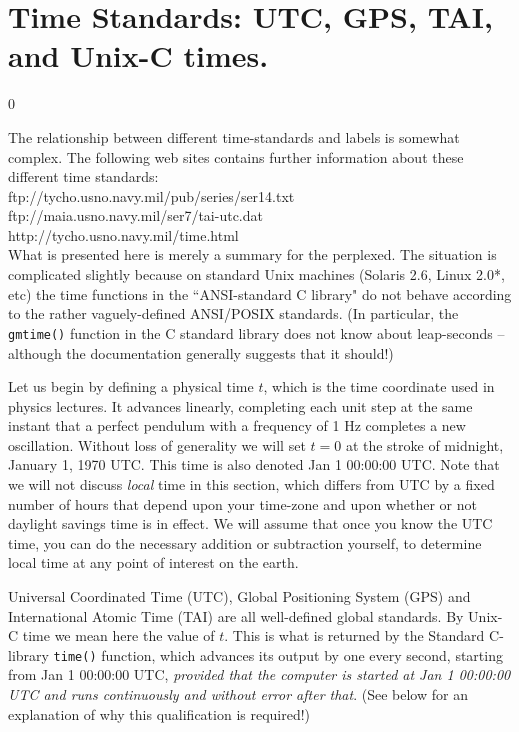 \clearpage
\section{Time Standards: UTC, GPS, TAI, and Unix-C times.}
\label{s:timestandards}
\setcounter{equation}0

The relationship between different time-standards and labels is somewhat
complex.  The following web sites contains further information about
these different time standards:\\
{ftp://tycho.usno.navy.mil/pub/series/ser14.txt}\\
{ftp://maia.usno.navy.mil/ser7/tai-utc.dat}\\
{http://tycho.usno.navy.mil/time.html}\\
What is presented here is merely a summary for the perplexed.
The situation is complicated slightly because on standard Unix machines
(Solaris 2.6, Linux 2.0*, etc) the time functions in the ``ANSI-standard C
library" do not behave according to the rather vaguely-defined ANSI/POSIX
standards.  (In particular, the {\tt gmtime()} function in the C standard
library does not know about leap-seconds -- although the documentation
generally suggests that it should!)

Let us begin by defining a physical time $t$, which is the time coordinate
used in physics lectures.  It advances linearly, completing each unit
step at the same instant that a perfect pendulum with a frequency of 1
Hz completes a new oscillation.  Without loss of generality we will set
$t=0$ at the stroke of midnight, January 1, 1970 UTC.  This time is also
denoted Jan 1 00:00:00 UTC.  Note that we will not discuss {\it local}
time in this section, which differs from UTC by a fixed number of hours
that depend upon your time-zone and upon whether or not daylight savings
time is in effect.  We will assume that once you know the UTC time,
you can do the necessary addition or subtraction yourself, to determine
local time at any point of interest on the earth.

Universal Coordinated Time (UTC), Global Positioning System (GPS) and
International Atomic Time (TAI) are all well-defined global standards.
By Unix-C time we mean here the value of $t$.  This is what is returned
by the Standard C-library {\tt time()} function, which advances
its output by one every second, starting from Jan 1 00:00:00 UTC,
{\it provided that the computer is started at  Jan 1 00:00:00 UTC and
runs continuously and without error after that}.  (See below for an
explanation of why this qualification is required!)


